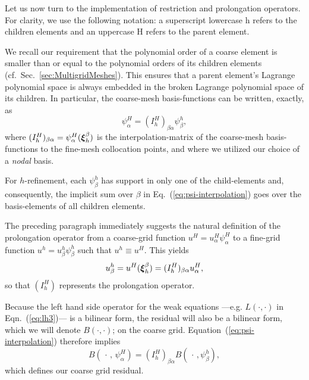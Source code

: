 Let us now turn to the implementation of restriction and prolongation operators.
For clarity, we use the
following notation: a superscript lowercase h refers to the children
elements and an uppercase H refers to the parent element.

We recall our requirement that the polynomial order of a coarse element is smaller than or equal to the polynomial orders of its children elements (cf.~Sec.~\ref{sec:MultigridMeshes}).
This ensures that a parent element's Lagrange
polynomial space is always embedded in the broken Lagrange polynomial space of
its children. In particular, the coarse-mesh basis-functions can be written, exactly, as
\begin{equation}\label{eq:psi-interpolation}
  \psi_\alpha^{H}=(I_{h}^{H})_{\beta\alpha}\psi_\beta^{h},
\end{equation}
%
where $(I_{h}^{H})_{\beta\alpha}=\psi_\alpha^H(\boldsymbol{\xi}^\beta_h)$ is the interpolation-matrix
of the coarse-mesh basis-functions to the fine-mesh collocation
points, and where we utilized our choice of a \emph{nodal} basis.

For
$h$-refinement, each $\psi_\beta^{h}$ has support in only one of the
child-elements and, consequently, the implicit sum over $\beta$ in
Eq.~(\ref{eq:psi-interpolation}) goes over the basis-elements of all
children elements.

The preceding paragraph immediately suggests the natural definition of the prolongation operator from a coarse-grid function $u^{H}\!=\!u^{H}_\alpha\psi_\alpha^{H}$ to a fine-grid
  function $u^{h}\!=\!u^{h}_\beta\psi_\beta^{h}$ such that $u^{h}\equiv u^{H}$.   This yields
  \begin{equation}
    u^{h}_\beta= u^{H}(\boldsymbol{\xi}^\beta_h)    = (I_{h}^{H})_{\beta\alpha} u^{H}_\alpha,
    \end{equation}so that $(I_{h}^{H})$ represents the prolongation operator.

Because the left hand side operator for the weak equations ---e.g. $L(\cdot,\cdot)$ in Eqn.~(\ref{eq:lh3})--- is a bilinear form, the residual will also be a bilinear form, which we will denote $B(\cdot,\cdot)$; on the coarse grid.  Equation~(\ref{eq:psi-interpolation}) therefore implies
  \begin{equation}\label{eq:temp-G}
    B(\,\cdot\,, \,\psi_\alpha^{H})=(I_{h}^{H})_{\beta\alpha}B(\,\cdot\,,\psi_\beta^{h}),
  \end{equation}
  which defines our coarse grid residual.

